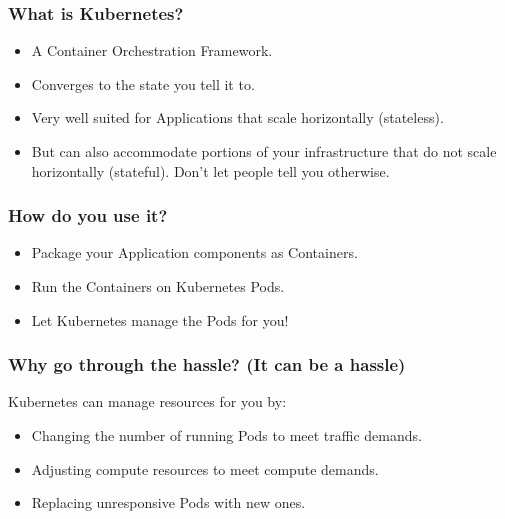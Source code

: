     \begin{frame}
        \frametitle{What is Kubernetes?}
        \begin{itemize}
            \item{A Container Orchestration Framework.}\pause
            \item{Converges to the state you tell it to.}\pause
            \item{Very well suited for Applications that scale horizontally (stateless).}\pause
            \item{But can also accommodate portions of your infrastructure that do not scale horizontally (stateful). Don't let people tell you otherwise.}
        \end{itemize}
    \end{frame}

    \begin{frame}
        \frametitle{How do you use it?}
        \begin{itemize}
            \item{Package your Application components as Containers.}\pause
            \item{Run the Containers on Kubernetes Pods.}\pause
            \item{Let Kubernetes manage the Pods for you!}
        \end{itemize}
    \end{frame}

    \begin{frame}
        \frametitle{Why go through the hassle? (It can be a hassle)}
        Kubernetes can manage resources for you by:\pause
        \begin{itemize}
            \item{Changing the number of running Pods to meet traffic demands.}\pause
            \item{Adjusting compute resources to meet compute demands.}\pause
            \item{Replacing unresponsive Pods with new ones.}
        \end{itemize}
    \end{frame}

